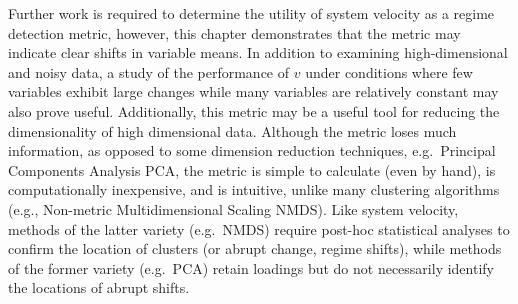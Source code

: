 \documentclass[12pt,twoside,openany]{reedthesis}
\begin{document}
Further work is required to determine the utility of system velocity as a regime detection metric, however, this chapter demonstrates that the metric may indicate clear shifts in variable means. In addition to examining high-dimensional and noisy data, a study of the performance of \(v\) under conditions where few variables exhibit large changes while many variables are relatively constant may also prove useful. Additionally, this metric may be a useful tool for reducing the dimensionality of high dimensional data. Although the metric loses much information, as opposed to some dimension reduction techniques, e.g.~Principal Components Analysis PCA, the metric is simple to calculate (even by hand), is computationally inexpensive, and is intuitive, unlike many clustering algorithms (e.g., Non-metric Multidimensional Scaling NMDS). Like system velocity, methods of the latter variety (e.g.~NMDS) require post-hoc statistical analyses to confirm the location of clusters (or abrupt change, regime shifts), while methods of the former variety (e.g.~PCA) retain loadings but do not necessarily identify the locations of abrupt shifts.
\end{document}
